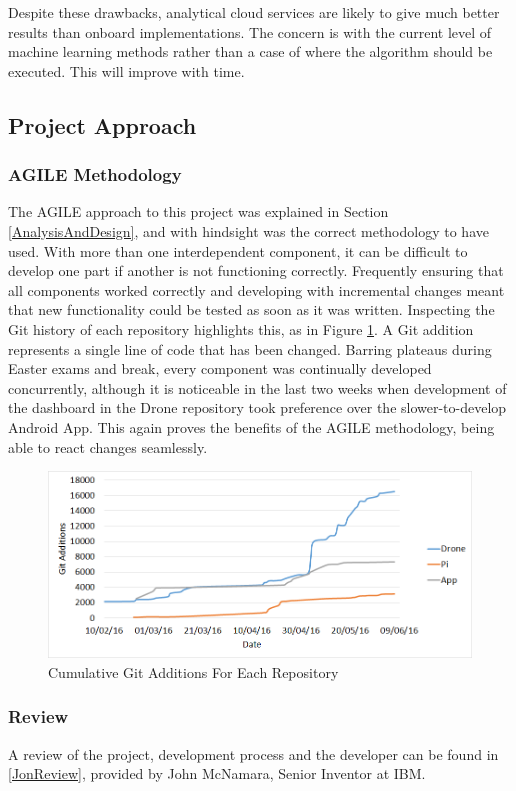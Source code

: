 \documentclass{article}
\begin{document}
Despite these drawbacks, analytical cloud services are likely to give much better results than onboard implementations. The concern is with the current level of machine learning methods rather than a case of where the algorithm should be executed. This will improve with time.

\subsection{Project Approach}
\subsubsection{AGILE Methodology}
The AGILE approach to this project was explained in Section \ref{AnalysisAndDesign}, and with hindsight was the correct methodology to have used. With more than one interdependent component, it can be difficult to develop one part if another is not functioning correctly. Frequently ensuring that all components worked correctly and developing with incremental changes meant that new functionality could be tested as soon as it was written. Inspecting the Git history of each repository highlights this, as in Figure \ref{fig:GitAnalysis}. A Git addition represents a single line of code that has been changed. Barring plateaus during Easter exams and break, every component was continually developed concurrently, although it is noticeable in the last two weeks when development of the dashboard in the Drone repository took preference over the slower-to-develop Android App. This again proves the benefits of the AGILE methodology, being able to react changes seamlessly.

\begin{figure}[h]
\centering
\caption{Cumulative Git Additions For Each Repository\label{fig:GitAnalysis}}
\includegraphics[width=\textwidth]{GitAnalysis}
\end{figure}


\subsubsection{Review}
A review of the project, development process and the developer can be found in \ref{JonReview}, provided by John McNamara, Senior Inventor at IBM.
\end{document}
